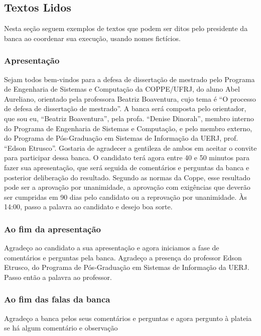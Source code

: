 \documentclass[a4paper,12pt]{article}
\begin{document}
\subsection{Textos Lidos}

Nesta seção seguem exemplos de textos que podem ser ditos pelo presidente da banca ao coordenar sua execução, usando nomes fictícios.

\subsubsection{Apresentação}

Sejam todos bem-vindos para a defesa de dissertação de mestrado pelo Programa de Engenharia de Sistemas e Computação da COPPE/UFRJ, do aluno Abel Aureliano, orientado pela professora Beatriz Boaventura, cujo tema é ``O processo de defesa de dissertação de mestrado''. A banca será composta pelo orientador, que sou eu, ``Beatriz Boaventura'', pela profa. ``Denise Dinorah'', membro interno do Programa de Engenharia de Sistemas e Computação, e pelo membro externo, do Programa de Pós-Graduação em Sistemas de Informação da UERJ, prof. ``Edson Etrusco''. Gostaria de agradecer a gentileza de ambos em aceitar o convite para participar dessa banca. O candidato terá agora entre 40 e 50 minutos para fazer sua apresentação, que será seguida de comentários e perguntas da banca e posterior deliberação do resultado.
Segundo as normas da Coppe, esse resultado pode ser a aprovação por unanimidade, a aprovação com exigências que deverão ser cumpridas em 90 dias pelo candidato ou a reprovação por unanimidade. 
Às 14:00, passo a palavra ao candidato e desejo boa sorte.


\subsubsection{Ao fim da apresentação}

Agradeço ao candidato a sua apresentação e agora iniciamos a fase de comentários e perguntas pela banca. Agradeço a presença do professor Edson Etrusco, do Programa de Pós-Graduação em Sistemas de Informação da UERJ. Passo então a palavra ao professor.

\subsubsection{Ao fim das falas da banca}

Agradeço a banca pelos seus comentários e perguntas e agora pergunto à plateia se há algum comentário e observação
\end{document}
